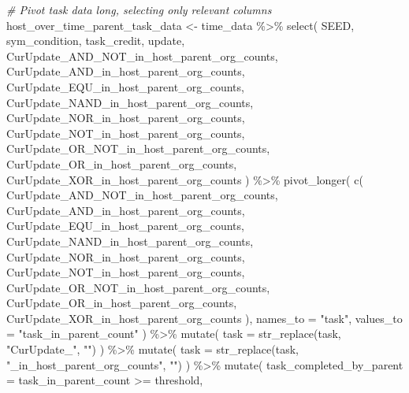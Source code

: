\documentclass[
]{book}
\newenvironment{Shaded}{\begin{snugshade}}{\end{snugshade}}
\newcommand{\AttributeTok}[1]{\textcolor[rgb]{0.77,0.63,0.00}{#1}}
\newcommand{\CommentTok}[1]{\textcolor[rgb]{0.56,0.35,0.01}{\textit{#1}}}
\newcommand{\FunctionTok}[1]{\textcolor[rgb]{0.00,0.00,0.00}{#1}}
\newcommand{\NormalTok}[1]{#1}
\newcommand{\OtherTok}[1]{\textcolor[rgb]{0.56,0.35,0.01}{#1}}
\newcommand{\SpecialCharTok}[1]{\textcolor[rgb]{0.00,0.00,0.00}{#1}}
\newcommand{\StringTok}[1]{\textcolor[rgb]{0.31,0.60,0.02}{#1}}
\begin{document}
\begin{Shaded}
\begin{Highlighting}[]
\CommentTok{\# Pivot task data long, selecting only relevant columns}
\NormalTok{host\_over\_time\_parent\_task\_data }\OtherTok{\textless{}{-}}\NormalTok{ time\_data }\SpecialCharTok{\%\textgreater{}\%}
  \FunctionTok{select}\NormalTok{(}
\NormalTok{    SEED,}
\NormalTok{    sym\_condition,}
\NormalTok{    task\_credit,}
\NormalTok{    update,}
\NormalTok{    CurUpdate\_AND\_NOT\_in\_host\_parent\_org\_counts,}
\NormalTok{    CurUpdate\_AND\_in\_host\_parent\_org\_counts,}
\NormalTok{    CurUpdate\_EQU\_in\_host\_parent\_org\_counts,}
\NormalTok{    CurUpdate\_NAND\_in\_host\_parent\_org\_counts,}
\NormalTok{    CurUpdate\_NOR\_in\_host\_parent\_org\_counts,}
\NormalTok{    CurUpdate\_NOT\_in\_host\_parent\_org\_counts,}
\NormalTok{    CurUpdate\_OR\_NOT\_in\_host\_parent\_org\_counts,}
\NormalTok{    CurUpdate\_OR\_in\_host\_parent\_org\_counts,}
\NormalTok{    CurUpdate\_XOR\_in\_host\_parent\_org\_counts}
\NormalTok{  ) }\SpecialCharTok{\%\textgreater{}\%}
  \FunctionTok{pivot\_longer}\NormalTok{(}
    \FunctionTok{c}\NormalTok{(}
\NormalTok{      CurUpdate\_AND\_NOT\_in\_host\_parent\_org\_counts,}
\NormalTok{      CurUpdate\_AND\_in\_host\_parent\_org\_counts,}
\NormalTok{      CurUpdate\_EQU\_in\_host\_parent\_org\_counts,}
\NormalTok{      CurUpdate\_NAND\_in\_host\_parent\_org\_counts,}
\NormalTok{      CurUpdate\_NOR\_in\_host\_parent\_org\_counts,}
\NormalTok{      CurUpdate\_NOT\_in\_host\_parent\_org\_counts,}
\NormalTok{      CurUpdate\_OR\_NOT\_in\_host\_parent\_org\_counts,}
\NormalTok{      CurUpdate\_OR\_in\_host\_parent\_org\_counts,}
\NormalTok{      CurUpdate\_XOR\_in\_host\_parent\_org\_counts}
\NormalTok{    ),}
    \AttributeTok{names\_to =} \StringTok{"task"}\NormalTok{,}
    \AttributeTok{values\_to =} \StringTok{"task\_in\_parent\_count"}
\NormalTok{  ) }\SpecialCharTok{\%\textgreater{}\%}
  \FunctionTok{mutate}\NormalTok{(}
    \AttributeTok{task =} \FunctionTok{str\_replace}\NormalTok{(task, }\StringTok{"CurUpdate\_"}\NormalTok{, }\StringTok{""}\NormalTok{)}
\NormalTok{  ) }\SpecialCharTok{\%\textgreater{}\%}
  \FunctionTok{mutate}\NormalTok{(}
    \AttributeTok{task =} \FunctionTok{str\_replace}\NormalTok{(task, }\StringTok{"\_in\_host\_parent\_org\_counts"}\NormalTok{, }\StringTok{""}\NormalTok{)}
\NormalTok{  ) }\SpecialCharTok{\%\textgreater{}\%}
  \FunctionTok{mutate}\NormalTok{(}
    \AttributeTok{task\_completed\_by\_parent =}\NormalTok{ task\_in\_parent\_count }\SpecialCharTok{\textgreater{}=}\NormalTok{ threshold,}

\end{Highlighting}
\end{Shaded}
\end{document}
